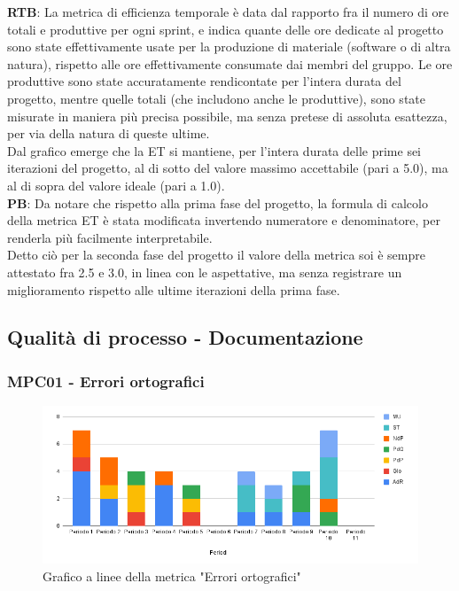 \documentclass[10pt]{article}
\begin{document}
\begin{justify}
\textbf{RTB}: La metrica di efficienza temporale è data dal rapporto fra il numero di ore totali e produttive per ogni sprint, e indica quante delle ore dedicate al progetto
sono state effettivamente usate per la produzione di materiale (software o di altra natura), rispetto alle ore effettivamente consumate dai membri del gruppo. Le ore 
produttive sono state accuratamente rendicontate per l'intera durata del progetto, mentre quelle totali (che includono anche le produttive), sono state misurate in
maniera più precisa possibile, ma senza pretese di assoluta esattezza, per via della natura di queste ultime.\\
Dal grafico emerge che la ET si mantiene, per l'intera durata delle prime sei iterazioni del progetto,  al di sotto del valore massimo accettabile (pari a 5.0), ma al di 
sopra del valore ideale (pari a 1.0).\\

\noindent
\textbf{PB}: Da notare che rispetto alla prima fase del progetto, la formula di calcolo della metrica ET è stata modificata invertendo numeratore e denominatore, per 
renderla più facilmente interpretabile.\\
Detto ciò per la seconda fase del progetto il valore della metrica soi è sempre attestato fra 2.5 e 3.0, in linea con le aspettative, ma senza registrare un miglioramento 
rispetto alle ultime iterazioni della prima fase.\\


\subsection{Qualità di processo - Documentazione}
\subsubsection{MPC01 - Errori ortografici}

\begin{figure}[H]
  \centering
  \includegraphics[width=0.9\linewidth]{EO.png}
  \caption{Grafico a linee della metrica "Errori ortografici"}
  \label{fig:EOchart}
\end{figure}


\end{justify}
\end{document}
